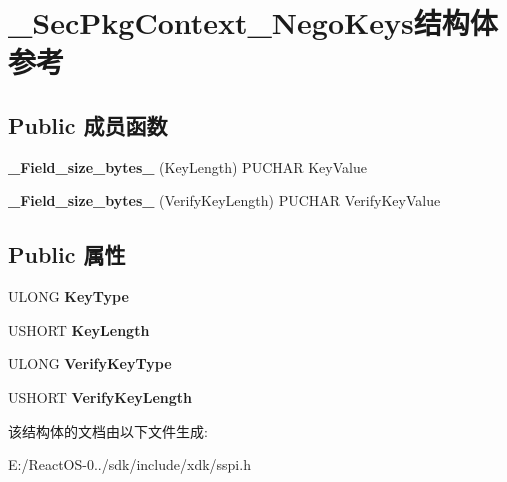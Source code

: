 \hypertarget{struct___sec_pkg_context___nego_keys}{}\section{\+\_\+\+Sec\+Pkg\+Context\+\_\+\+Nego\+Keys结构体 参考}
\label{struct___sec_pkg_context___nego_keys}
\subsection*{Public 成员函数}
\begin{DoxyCompactItemize}
\item 
\mbox{\label{struct___sec_pkg_context___nego_keys_af62187ace434880eeb0c570561641704}} 
{\bfseries \+\_\+\+Field\+\_\+size\+\_\+bytes\+\_\+} (Key\+Length) P\+U\+C\+H\+AR Key\+Value
\item 
\mbox{\label{struct___sec_pkg_context___nego_keys_a883c44cb75d80c96ea5d8a03f0b7ca9c}} 
{\bfseries \+\_\+\+Field\+\_\+size\+\_\+bytes\+\_\+} (Verify\+Key\+Length) P\+U\+C\+H\+AR Verify\+Key\+Value
\end{DoxyCompactItemize}
\subsection*{Public 属性}
\begin{DoxyCompactItemize}
\item 
\mbox{\label{struct___sec_pkg_context___nego_keys_a492eeff16bf80972d954794b50c60513}} 
U\+L\+O\+NG {\bfseries Key\+Type}
\item 
\mbox{\label{struct___sec_pkg_context___nego_keys_a833393c2cc29d38ebf34d77c71102aa5}} 
U\+S\+H\+O\+RT {\bfseries Key\+Length}
\item 
\mbox{\label{struct___sec_pkg_context___nego_keys_a665085ceff586c09ab67f07b44418d0d}} 
U\+L\+O\+NG {\bfseries Verify\+Key\+Type}
\item 
\mbox{\label{struct___sec_pkg_context___nego_keys_a98dfd6dee08352a8bbe9d27186a891ed}} 
U\+S\+H\+O\+RT {\bfseries Verify\+Key\+Length}
\end{DoxyCompactItemize}


该结构体的文档由以下文件生成\+:\begin{DoxyCompactItemize}
\item 
E\+:/\+React\+O\+S-\/0../sdk/include/xdk/sspi.\+h\end{DoxyCompactItemize}
